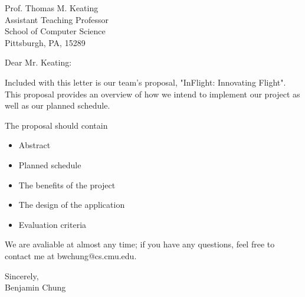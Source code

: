 \documentclass[10pt,a4paper]{letter}
\begin{document}
 
\begin{letter}{
Prof. Thomas M. Keating\\
Assistant Teaching Professor\\
School of Computer Science\\
Pittsburgh, PA, 15289} 
\opening{Dear Mr. Keating:} 
 
Included with this letter is our team's proposal, "InFlight: Innovating Flight". This proposal provides an overview of how we intend to implement our project as well as our planned schedule.

The proposal should contain
\begin{itemize}
\item Abstract
\item Planned schedule
\item The benefits of the project
\item The design of the application
\item Evaluation criteria
\end{itemize}

We are avaliable at almost any time; if you have any questions, feel free to contact me at bwchung@cs.cmu.edu.
\closing{Sincerely,\\ Benjamin Chung} 
\end{letter} 
\end{document}
